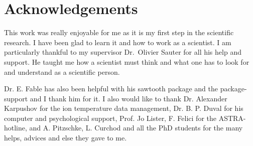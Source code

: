 \chapter*{Acknowledgements}\thispagestyle{fancy}
This work was really enjoyable for me as it is my first step in the scientific research. I have been glad to learn it and how to work as a scientist. I am particularly thankful to my supervisor Dr.~Olivier Sauter for all his help and support. He taught me how a scientist must think and what one has to look for and understand as a scientific person.

Dr. E. Fable has also been helpful with his sawtooth package and the package-support and I thank him for it. I also would like to thank Dr. Alexander Karpushov for the ion temperature data management, Dr. B. P. Duval for his computer and psychological support, Prof. Jo Lister, F. Felici for the ASTRA-hotline, and A. Pitzschke, L. Curchod and all the PhD students for the many helps, advices and else they gave to me.
